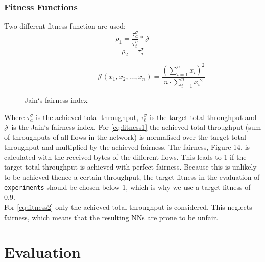 \subsection{Fitness Functions}\label{subsec:fitnessfunc}
Two different fitness function are used:
\begin{equation}\label{eq:fitness1}
\rho_1 = \frac{\tau_a^\sigma}{\tau_t^\sigma}*\mathcal{J} 
\end{equation}
\begin{equation}\label{eq:fitness2}
\rho_2 = \tau_a^\sigma
\end{equation}
\begin{figure}\label{fig:jain}
\[ \ \qquad \qquad \quad \mathcal{J} (x_1, x_2, \dots, x_n) = \frac{( \sum_{i=1}^n x_i )^2}{n \cdot \sum_{i=1}^n {x_i}^2}\]
\caption{Jain`s fairness index}
\end{figure}
Where $\tau_a^\sigma$ is the achieved total throughput, $\tau_t^\sigma$ is the target total throughput and $\mathcal{J}$ is the Jain`s fairness index.
For \autoref{eq:fitness1} the achieved total throughput (sum of throughputs of all flows in the network) is normalised over the target total throughput and multiplied by the achieved fairness. The fairness, Figure 14, is calculated with the received bytes of the different flows. This leads to 1 if the target total throughput is achieved with perfect fairness. Because this is unlikely to be achieved thence a certain throughput, the target fitness in the evaluation of \texttt{experiments} should be chosen below 1, which is why we use a target fitness of 0.9.\\
For \autoref{eq:fitness2} only the achieved total throughput is considered. This neglects fairness, which means that the resulting NNs are prone to be unfair.


\chapter{Evaluation}\label{ch:evaluation}
\glsresetall %


